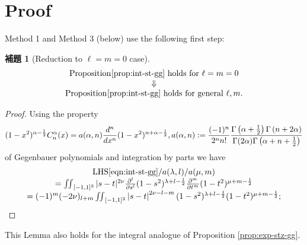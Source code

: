 \documentclass[pdf,notes]{beamer}
\newtheorem*{lemma*}{補題}
\begin{document}
\section{Proof}
\begin{frame}
	Method 1 and Method 3 (below) use the following first step:
	\begin{lemma*}[Reduction to $\ell=m=0$ case]
		\begin{equation*}
			\begin{array}[]{c}
				\mbox{Proposition \kern-0.1cm\ref{prop:int-st-gg} holds for $\ell=m=0$}\\
				\Downarrow\\
				\mbox{Proposition \kern-0.1cm\ref{prop:int-st-gg} holds for general $\ell,m$}.
			\end{array}
		\end{equation*}
	\end{lemma*}
	\begin{proof}
		Using the property {\scriptsize\vspace{-0.2cm}\begin{equation*}
				(1-x^2)^{\alpha-\frac{1}{2}}C_n^\alpha(x)=a(\alpha,n)
				\frac{d^n}{dx^n} (1-x^2)^{n+\alpha-\frac{1}{2}}, a(\alpha,n):=\frac{(-1)^n}{2^nn!}\frac{\Gamma\left( \alpha+\frac{1}{2} \right)\Gamma\left( n+2\alpha \right)}{\Gamma(2\alpha)\Gamma\left(\alpha+n+\frac{1}{2}  \right)}
			\vspace{-0.2cm}\end{equation*}\vspace{-0.2cm}}
				of Gegenbauer polynomials and integration by parts we have {\scriptsize\begin{equation}
			\vspace{-0.2cm}
					\begin{array}[]{c}
						\mbox{LHS}\eqref{eqn:int-st-gg}/a(\lambda,l)/a(\mu,m)\\
					=\iint\displaylimits_{[-1,1]^2}
					| s - t |^{2 \nu} \frac{\partial^l}{\partial s^l}(1-s^2)^{\lambda+l-\frac{1}{2}}\frac{\partial^m}{\partial t^m}(1-t^2)^{\mu+m-\frac{1}{2}}
					\\=(-1)^m(-2\nu)_{l+m}\iint\displaylimits_{[-1,1]^2}\myabs{s-t}^{2\nu-l-m}(1-s^2)^{\lambda+l-\frac{1}{2}}(1-t^2)^{\mu+m-\frac{1}{2}};
					\end{array}
					\label{eqn:m1-1}
				\end{equation}}
	\end{proof}
		This Lemma also holds for the integral analogue of Proposition \ref{prop:exp-stz-gg}.
\end{frame}
\end{document}
